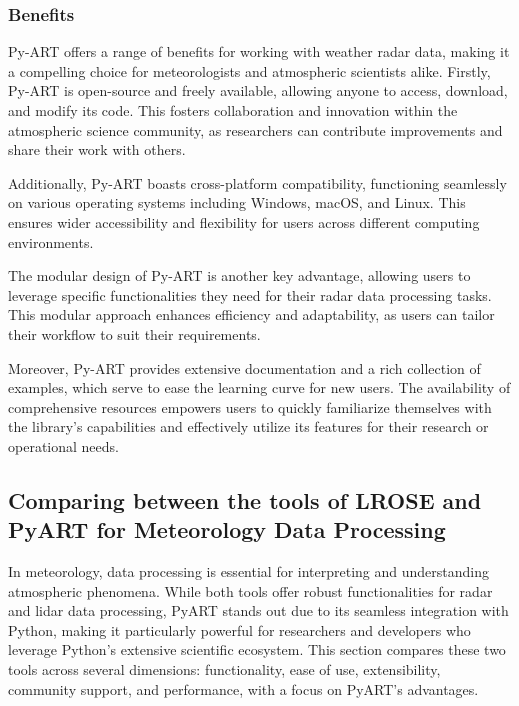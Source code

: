 \subsubsection*{Benefits}
Py-ART offers a range of benefits for working with weather radar data, making it
a compelling choice for meteorologists and atmospheric scientists alike.
Firstly, Py-ART is open-source and freely available, allowing anyone to access,
download, and modify its code. This fosters collaboration and innovation within
the atmospheric science community, as researchers can contribute improvements
and share their work with others.

Additionally, Py-ART boasts cross-platform compatibility, functioning seamlessly
on various operating systems including Windows, macOS, and Linux. This ensures
wider accessibility and flexibility for users across different computing
environments.

The modular design of Py-ART is another key advantage, allowing users to
leverage specific functionalities they need for their radar data processing
tasks. This modular approach enhances efficiency and adaptability, as users can
tailor their workflow to suit their requirements.

Moreover, Py-ART provides extensive documentation and a rich collection of
examples, which serve to ease the learning curve for new users. The availability
of comprehensive resources empowers users to quickly familiarize themselves with
the library's capabilities and effectively utilize its features for their
research or operational needs.


\subsection{Comparing between the tools of LROSE and PyART for Meteorology Data Processing}
In meteorology, data processing is essential for interpreting and understanding
atmospheric phenomena. While both tools offer robust functionalities for radar
and lidar data processing, PyART stands out due to its seamless integration with
Python, making it particularly powerful for researchers and developers who
leverage Python's extensive scientific ecosystem. This section compares these
two tools across several dimensions: functionality, ease of use, extensibility,
community support, and performance, with a focus on PyART's advantages.

